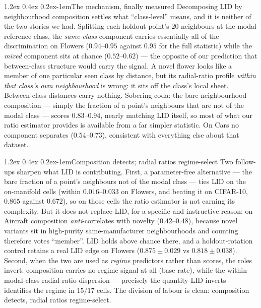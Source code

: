 \documentclass{article}
\makeatletter
\renewcommand\paragraph{\@startsection{paragraph}{4}{\z@}%
  {1.2ex \@plus 0.4ex \@minus 0.2ex}{-1em}{\normalsize\bf}}
\makeatother
\begin{document}
\paragraph{The mechanism, finally measured}
Decomposing LID by neighbourhood composition settles what ``class-level'' means,
and it is neither of the two stories we had. Splitting each holdout point's $20$
neighbours at the modal reference class, the \emph{same-class} component carries
essentially all of the discrimination on Flowers ($0.94$--$0.95$ against $0.95$
for the full statistic) while the \emph{mixed} component sits at chance
($0.52$--$0.62$) --- the opposite of our prediction that between-class structure
would carry the signal. A novel flower looks like a member of one particular
seen class by distance, but its radial-ratio profile \emph{within that class's
own neighbourhood} is wrong: it sits off the class's local sheet. Between-class
distances carry nothing. Sobering coda: the bare neighbourhood composition ---
simply the fraction of a point's neighbours that are not of the modal class ---
scores $0.83$--$0.94$, nearly matching LID itself, so most of what our
ratio estimator provides is available from a far simpler statistic. On Cars no
component separates ($0.54$--$0.73$), consistent with everything else about that
dataset.

\paragraph{Composition detects; radial ratios regime-select}
Two follow-ups sharpen what LID is contributing. First, a parameter-free
alternative --- the bare fraction of a point's neighbours not of the modal class
--- ties LID on the on-manifold cells (within $0.016$--$0.033$ on Flowers, and
beating it on CIFAR-10, $0.865$ against $0.672$), so on those cells the ratio
estimator is not earning its complexity. But it does not replace LID, for a
specific and instructive reason: on Aircraft composition \emph{anti}-correlates
with novelty ($0.42$--$0.48$), because novel variants sit in high-purity
same-manufacturer neighbourhoods and counting therefore votes ``member''. LID
holds above chance there, and a holdout-rotation control retains a real LID edge
on Flowers ($0.875\pm0.029$ vs $0.818\pm0.038$). Second, when the two are used
as \emph{regime} predictors rather than scores, the roles invert: composition
carries no regime signal at all (base rate), while the within-modal-class
radial-ratio dispersion --- precisely the quantity LID inverts --- identifies
the regime in $15/17$ cells. The division of labour is clean: composition
detects, radial ratios regime-select.
\end{document}
